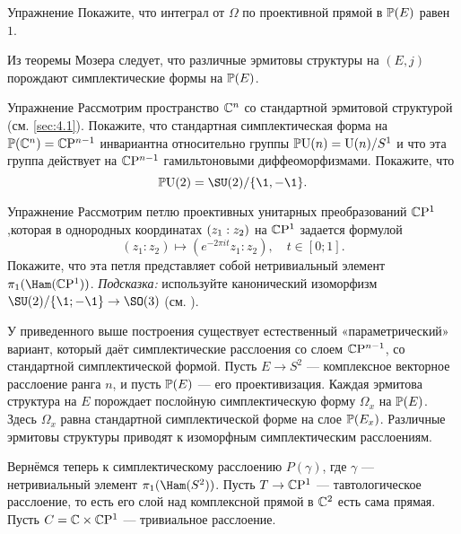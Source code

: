 \begin{ex}{Упражнение}\label{9.2.A}
  Покажите, что интеграл от $\Omega$ по проективной прямой в $\mathbb{P}(E)$
  равен $1$.
\end{ex}

Из теоремы Мозера \cite{MS} следует, что различные эрмитовы структуры
на $(E, j)$ порождают  симплектические формы на
$\mathbb{P}(E)$. 

\begin{ex}{Упражнение}\label{9.2.B}
  Рассмотрим пространство $\mathbb{C}^n$ со стандартной эрмитовой структурой
  (см. \ref{sec:4.1}).
  Покажите, что стандартная симплектическая форма на $\mathbb{P}(\mathbb{C}^n ) =
  \mathbb{C}\mathrm{P}^{n-1}$ инвариантна относительно группы $\mathbb{P}\mathrm{U} (n) = \mathrm{U} (n)/S^1$ и
  что эта группа действует на $\mathbb{C}\mathrm{P}^{n-1}$ гамильтоновыми
  диффеоморфизмами.
  Покажите, что 
  \[\PU (2) = \SU (2)/\{\1, -\1\}.\]
\end{ex}
 
\begin{ex}{Упражнение}\label{9.2.C}
Рассмотрим петлю проективных унитарных преобразований $\mathbb{C}\mathrm{P}^1$,которая в однородных координатах $(z_1 \z: z_2)$ на $\mathbb{C}\mathrm{P}^1$ задается формулой
\[(z_1 : z_2 ) \mapsto (e^{-2\pi it} z_1 : z_2 ),\quad t \in [0; 1].\]
Покажите, что эта петля представляет собой нетривиальный элемент $\pi_1 (\Ham(\CP^1 ))$.
\emph{Подсказка:} используйте канонический изоморфизм $\SU (2)/\{\1; -\1\}\to \SO(3)$ (см. \cite{DFN}).  
\end{ex}

У приведенного выше построения существует естественный
«параметрический» вариант, который даёт симплектические расслоения со
слоем $\mathbb{C}\mathrm{P}^{n-1}$, со стандартной симплектической формой. 
Пусть $E \to S^2$ — комплексное векторное расслоение ранга $n$, и
пусть $\mathbb{P}(E)$ — его проективизация. 
Каждая эрмитова структура на $E$ порождает послойную симплектическую
форму $\Omega_x$ на $\mathbb{P}(E)$. 
Здесь $\Omega_x$ равна стандартной симплектической форме на слое
$\mathbb{P}(E_x)$.
Различные эрмитовы структуры приводят к изоморфным симплектическим
расслоениям. 

Вернёмся теперь к симплектическому расслоению $P(\gamma)$, где
$\gamma$ — нетривиальный элемент $\pi_1 (\Ham(S^2 ))$. 
Пусть $T \to \mathbb{C}\mathrm{P}^1$ — тавтологическое расслоение,
то есть его слой над комплексной прямой в $\mathbb{C}^2$ есть сама прямая. 
Пусть $C = \mathbb{C} \times \mathbb{C}\mathrm{P}^1$ — тривиальное расслоение.
 
